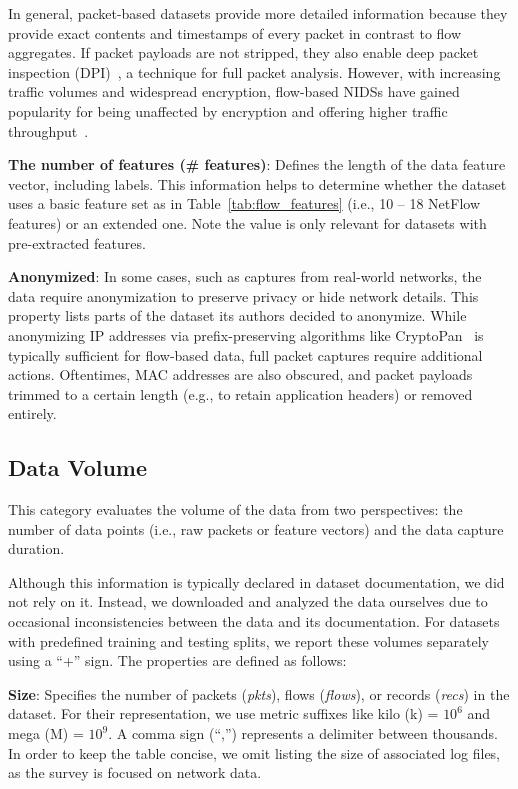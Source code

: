 In general, packet-based datasets provide more detailed information because they provide exact contents and timestamps of every packet in contrast to flow aggregates. If packet payloads are not stripped, they also enable deep packet inspection (DPI)~\cite{finsterbusch2014_payload_based_classification_survey}, a technique for full packet analysis. However, with increasing traffic volumes and widespread encryption, flow-based NIDSs have gained popularity for being unaffected by encryption and offering higher traffic throughput~\cite{umer2017_flowbased_ids_techniques,sperotto2010_flow_based_ids}.

\textbf{The number of features (\# features)}: Defines the length of the data feature vector, including labels. This information helps to determine whether the dataset uses a basic feature set as in Table~\ref{tab:flow_features} (i.e., 10 -- 18 NetFlow features) or an extended one. Note the value is only relevant for datasets with pre-extracted features.

\textbf{Anonymized}: In some cases, such as captures from real-world networks, the data require anonymization to preserve privacy or hide network details. This property lists parts of the dataset its authors decided to anonymize. While anonymizing IP addresses via prefix-preserving algorithms like CryptoPan~\cite{xu2002_cryptopan} is typically sufficient for flow-based data, full packet captures require additional actions. Oftentimes, MAC addresses are also obscured, and packet payloads trimmed to a certain length (e.g., to retain application headers) or removed entirely.

\subsection{Data Volume}
\label{ssec:dprops_data_volume}

This category evaluates the volume of the data from two perspectives: the number of data points (i.e., raw packets or feature vectors) and the data capture duration.

Although this information is typically declared in dataset documentation, we did not rely on it. Instead, we downloaded and analyzed the data ourselves due to occasional inconsistencies between the data and its documentation. For datasets with predefined training and testing splits, we report these volumes separately using a ``+'' sign. The properties are defined as follows:

\textbf{Size}: Specifies the number of packets (\emph{pkts}), flows (\emph{flows}), or records (\emph{recs}) in the dataset. For their representation, we use metric suffixes like kilo (k) = $10^6$ and mega (M) = $10^9$. A comma sign (``,'') represents a delimiter between thousands. In order to keep the table concise, we omit listing the size of associated log files, as the survey is focused on network data.

